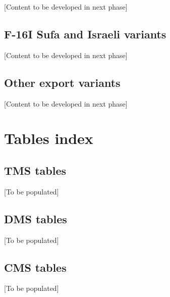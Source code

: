 \documentclass[11pt,a4paper]{article}
\begin{document}
[Content to be developed in next phase]

\subsection{F-16I Sufa and Israeli variants}

[Content to be developed in next phase]

\subsection{Other export variants}

[Content to be developed in next phase]

\section{Tables index}

\subsection{TMS tables}

[To be populated]

\subsection{DMS tables}

[To be populated]

\subsection{CMS tables}

[To be populated]
\end{document}
